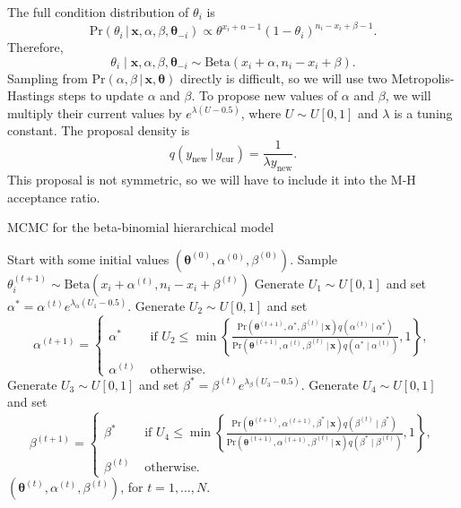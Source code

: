 \documentclass[11pt]{article}
\newcommand{\cprob}[2]{\ensuremath{\text{Pr}\left(#1 \,|\,#2\right)}}
\theoremstyle{remark}
\theoremstyle{definition}
\numberwithin{equation}{section}
\numberwithin{figure}{section}
\begin{document}
  The full condition distribution of $\theta_i$ is
  \[
  \cprob{\theta_i}{\mathbf{x},\alpha,\beta,\boldsymbol{\theta}_{-i}} \propto 
  \theta^{x_i+\alpha-1}(1-\theta_i)^{n_i-x_i+\beta-1}.
  \]
  Therefore, 
  \[
  \theta_i \mid \mathbf{x}, \alpha, \beta, \boldsymbol{\theta}_{-i} \sim 
  \text{Beta}(x_i+\alpha, n_i - x_i + \beta).
  \]
  Sampling from 
  $\cprob{\alpha,\beta}{\mathbf{x},\boldsymbol{\theta}}$ directly is difficult, so we will use 
  two  Metropolis-Hastings steps to update $\alpha$ and $\beta$. To propose new values of $\alpha$ and 
  $\beta$, we will multiply their current 
  values by $e^{\lambda(U-0.5)}$, where $U \sim U[0,1]$ and $\lambda$ is a tuning constant. 
  The proposal density is
  \[
  q(y_{\text{new}}\,|\,y_{\text{cur}}) = \frac{1}{\lambda y_{\text{new}}}.
  \]
  This proposal is not symmetric, so we will have to include it into the M-H acceptance ratio.
  \begin{algorithm}
    \caption{MCMC for the beta-binomial hierarchical model}
    \label{giibs}
    \begin{algorithmic}[1]
      \STATE Start with some initial values $(\boldsymbol{\theta}^{(0)},\alpha^{(0)},\beta^{(0)})$.
      \STATE Sample $\theta_i^{(t+1)} \sim \text{Beta}(x_i + \alpha^{(t)}, n_i-x_i+\beta^{(t)})$
      \ENDFOR
      \STATE Generate $U_1 \sim U[0,1]$ and set $\alpha^* = \alpha^{(t)}e^{\lambda_{\alpha}(U_1-0.5)}$. Generate 
      $U_2 \sim U[0,1]$ and set
      \[
      \alpha^{(t+1)} = 
      \begin{cases}
        \alpha^* &\text{ if } 
        U_2 \le \min\left\{\frac{
            \cprob{\boldsymbol{\theta}^{(t+1)},\alpha^*,\beta^{(t)}}{\mathbf{x}}q(\alpha^{(t)}\mid \alpha^*)}
          {\cprob{\boldsymbol{\theta}^{(t+1)},\alpha^{(t)},\beta^{(t)}}{\mathbf{x}}q(\alpha^*\mid \alpha^{(t)})},
          1\right\},\\
        \alpha^{(t)} & \text{ otherwise}.
      \end{cases}
      \]
      \STATE Generate $U_3 \sim U[0,1]$ and set $\beta^* = \beta^{(t)}e^{\lambda_{\beta}(U_3-0.5)}$. Generate 
      $U_4 \sim U[0,1]$ and set
      \[
      \beta^{(t+1)} = 
      \begin{cases}
        \beta^* &\text{ if } 
        U_4 \le \min\left\{\frac{
            \cprob{\boldsymbol{\theta}^{(t+1)},\alpha^{(t+1)},\beta^*}{\mathbf{x}}q(\beta^{(t)}\mid \beta^*)}
          {\cprob{\boldsymbol{\theta}^{(t+1)},\alpha^{(t+1)},\beta^{(t)}}{\mathbf{x}}q(\beta^*\mid \beta^{(t)})},
          1\right\},\\
        \beta^{(t)} & \text{ otherwise}.
      \end{cases}
      \]
    \ENDFOR
    \RETURN $(\boldsymbol{\theta}^{(t)},\alpha^{(t)},\beta^{(t)})$, for $t=1,\dots,N$.
  \end{algorithmic}
\end{algorithm}
\end{document}
